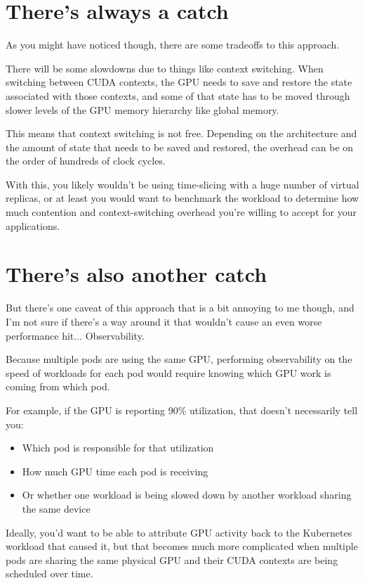 \section{There's always a catch}

As you might have noticed though, there are some tradeoffs to this approach.

There will be some slowdowns due to things like context switching. When switching between CUDA contexts, the GPU needs to save and restore the state associated with those contexts, and some of that state has to be moved through slower levels of the GPU memory hierarchy like global memory.

This means that context switching is not free. Depending on the architecture and the amount of state that needs to be saved and restored, the overhead can be on the order of hundreds of clock cycles.

With this, you likely wouldn't be using time-slicing with a huge number of virtual replicas, or at least you would want to benchmark the workload to determine how much contention and context-switching overhead you're willing to accept for your applications.

\section{There's also another catch}

But there's one caveat of this approach that is a bit annoying to me though, and I'm not sure if there's a way around it that wouldn't cause an even worse performance hit... Observability.

Because multiple pods are using the same GPU, performing observability on the speed of workloads for each pod would require knowing which GPU work is coming from which pod.

For example, if the GPU is reporting 90\% utilization, that doesn't necessarily tell you:
\begin{itemize}
\item Which pod is responsible for that utilization
\item How much GPU time each pod is receiving
\item Or whether one workload is being slowed down by another workload sharing the same device
\end{itemize}

Ideally, you'd want to be able to attribute GPU activity back to the Kubernetes workload that caused it, but that becomes much more complicated when multiple pods are sharing the same physical GPU and their CUDA contexts are being scheduled over time.

